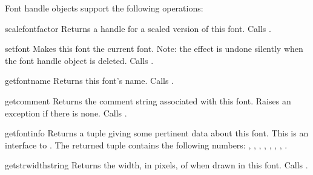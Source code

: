 Font handle objects support the following operations:

\begin{funcdesc}{scalefont}{factor}
Returns a handle for a scaled version of this font.
Calls .
\end{funcdesc}

\begin{funcdesc}{setfont}{}
Makes this font the current font.
Note: the effect is undone silently when the font handle object is
deleted.
Calls .
\end{funcdesc}

\begin{funcdesc}{getfontname}{}
Returns this font's name.
Calls .
\end{funcdesc}

\begin{funcdesc}{getcomment}{}
Returns the comment string associated with this font.
Raises an exception if there is none.
Calls .
\end{funcdesc}

\begin{funcdesc}{getfontinfo}{}
Returns a tuple giving some pertinent data about this font.
This is an interface to .
The returned tuple contains the following numbers:
\code{(}, , ,
, , , ,
\code{)}.
\end{funcdesc}

\begin{funcdesc}{getstrwidth}{string}
Returns the width, in pixels, of  when drawn in this font.
Calls .
\end{funcdesc}
